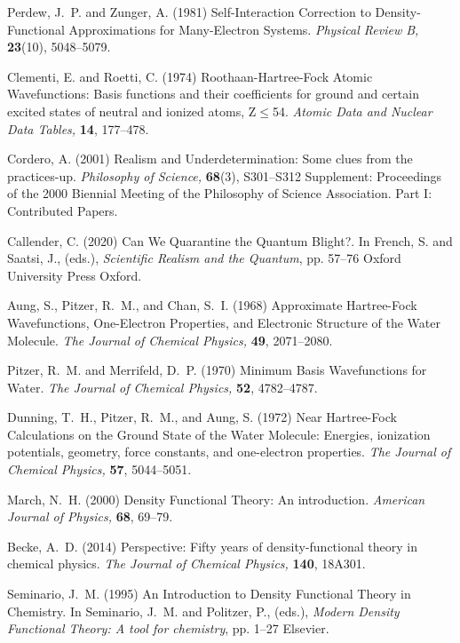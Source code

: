 \documentclass[onecolumn,secnumarabic,amsmath,amssymb,balancelastpage,nofootinbib]{article}
\begin{document}
\begin{thebibliography}{100}
Perdew, J.~P. and Zunger, A. (1981)
Self-Interaction Correction to Density-Functional Approximations for
  Many-Electron Systems.
{\em Physical Review B,} {\bf 23}(10), 5048--5079.

Clementi, E. and Roetti, C. (1974)
Roothaan-Hartree-Fock Atomic Wavefunctions: Basis functions and their
  coefficients for ground and certain excited states of neutral and ionized
  atoms, Z$\leq$54.
{\em Atomic Data and Nuclear Data Tables,} {\bf 14}, 177--478.

Cordero, A. (2001)
Realism and Underdetermination: Some clues from the practices-up.
{\em Philosophy of Science,} {\bf 68}(3), S301--S312
Supplement: Proceedings of the 2000 Biennial Meeting of the Philosophy of
  Science Association. Part I: Contributed Papers.

Callender, C. (2020)
Can We Quarantine the Quantum Blight?.
In French, S. and Saatsi, J., (eds.), \emph{Scientific Realism and the
  Quantum},  pp. 57--76 Oxford University Press Oxford.

Aung, S., Pitzer, R.~M., and Chan, S.~I. (1968)
Approximate Hartree-Fock Wavefunctions, One-Electron Properties, and Electronic
  Structure of the Water Molecule.
{\em The Journal of Chemical Physics,} {\bf 49}, 2071--2080.

Pitzer, R.~M. and Merrifeld, D.~P. (1970)
Minimum Basis Wavefunctions for Water.
{\em The Journal of Chemical Physics,} {\bf 52}, 4782--4787.

Dunning, T.~H., Pitzer, R.~M., and Aung, S. (1972)
Near Hartree-Fock Calculations on the Ground State of the Water Molecule:
  Energies, ionization potentials, geometry, force constants, and one-electron
  properties.
{\em The Journal of Chemical Physics,} {\bf 57}, 5044--5051.

March, N.~H. (2000)
Density Functional Theory: An introduction.
{\em American Journal of Physics,} {\bf 68}, 69--79.

Becke, A.~D. (2014)
Perspective: Fifty years of density-functional theory in chemical physics.
{\em The Journal of Chemical Physics,} {\bf 140}, 18A301.

Seminario, J.~M. (1995)
An Introduction to Density Functional Theory in Chemistry.
In Seminario, J.~M. and Politzer, P., (eds.), \emph{Modern Density Functional
  Theory: A tool for chemistry},  pp. 1--27 Elsevier.


\end{thebibliography}
\end{document}
